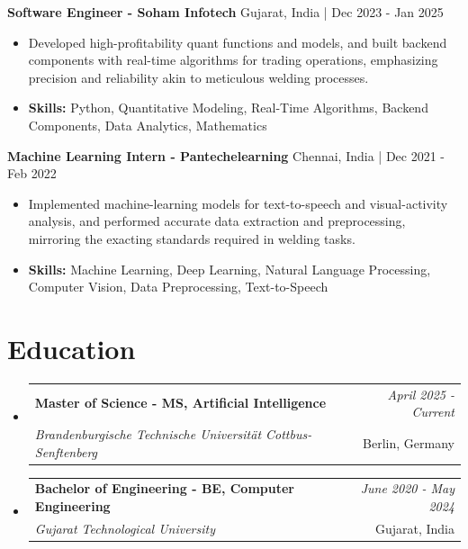 \documentclass[a4paper,11pt]{article}
\makeatletter
\newcommand{\resumeSubheading}[4]{
\vspace{0.5mm}\item
    \begin{tabular*}{\linewidth}[t]{l@{\extracolsep{\fill}}r}
        \textbf{#1} & \textit{\footnotesize{#4}} \\
        \textit{\footnotesize{#3}} &  \footnotesize{#2}\\
    \end{tabular*}
    \vspace{-2.4mm}
}
\makeatother
\begin{document}
\vspace{1mm}
  \textbf{Software Engineer - Soham Infotech} \hfill Gujarat, India | Dec 2023 - Jan 2025
\vspace{-1.5mm} %
\begin{itemize}
  \item Developed high-profitability quant functions and models, and built backend components with real-time algorithms for trading operations, emphasizing precision and reliability akin to meticulous welding processes.

\vspace{-2mm}
  \item \textbf{Skills:} Python, Quantitative Modeling, Real-Time Algorithms, Backend Components, Data Analytics, Mathematics
\end{itemize}

\vspace{1mm}
  \textbf{Machine Learning Intern - Pantechelearning} \hfill Chennai, India | Dec 2021 - Feb 2022
\vspace{-1.5mm} %
\begin{itemize}
  \item Implemented machine-learning models for text-to-speech and visual-activity analysis, and performed accurate data extraction and preprocessing, mirroring the exacting standards required in welding tasks.
\vspace{-2mm}
  \item \textbf{Skills:} Machine Learning, Deep Learning, Natural Language Processing, Computer Vision, Data Preprocessing, Text-to-Speech
\end{itemize}\section{\textbf{Education}}
\vspace{-0.4mm}

\begin{itemize}[leftmargin=0.15in, label={}]
\resumeSubheading
{Master of Science - MS, Artificial Intelligence }{Berlin, Germany}
{Brandenburgische Technische Universität Cottbus-Senftenberg  }{April 2025 - Current}

\vspace{1.0mm} %
\resumeSubheading
{Bachelor of Engineering - BE, Computer Engineering  }{Gujarat, India}
{Gujarat Technological University }{June 2020 - May 2024}

\end{itemize}
\end{document}
